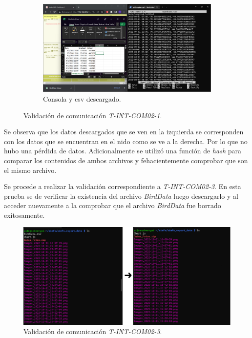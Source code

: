 \begin{figure}[H]
	\ContinuedFloat
	\centering
	\begin{subfigure}{\textwidth}
		\centering
		\includegraphics[width=0.8\linewidth]{ImagenesValidacion del prototipo/TINTCOM21}
		\caption{Consola y csv descargado.}
	\end{subfigure}
	\caption{Validación de comunicación \textit{T-INT-COM02-1}.}
\end{figure}

Se observa que los datos descargados que se ven en la izquierda se corresponden con los datos que se encuentran en el nido como se ve a la derecha. Por lo que no hubo una pérdida de datos.
Adicionalmente se utilizó una función de \textit{hash} para comparar los contenidos de ambos archivos y fehacientemente comprobar que son el mismo archivo. 

Se procede a realizar la validación correspondiente a \textit{T-INT-COM02-3}. En esta prueba se de verificar la existencia del archivo \textit{BirdData} luego descargarlo y al acceder nuevamente a la \rspi comprobar que el archivo \textit{BirdData} fue borrado exitosamente.
\begin{figure}[H]
\centering
	\includegraphics[width=1\linewidth]{ImagenesValidacion del prototipo/TINTCOM23}
	\caption{Validación de comunicación \textit{T-INT-COM02-3}.}
\end{figure}

